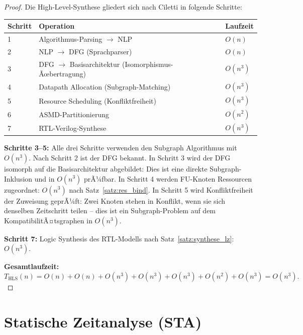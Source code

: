 ﻿\documentclass[a4paper,12pt]{article}
\theoremstyle{definition}
\begin{document}
\begin{proof}
  Die High-Level-Synthese gliedert sich nach Ciletti \cite[S.~550, Abb.~9-2]{ciletti2011}
  in folgende Schritte:

  \begin{center}
  \begin{tabular}{lll}
    \toprule
    Schritt & Operation & Laufzeit \\
    \midrule
    1 & Algorithmus-Parsing $\to$ NLP & $O(n)$ \\
    2 & NLP $\to$ DFG (Sprachparser) & $O(n)$ \\
    3 & DFG $\to$ Basisarchitektur (Isomorphismus-Ãœbertragung) & $O(n^3)$ \\
    4 & Datapath Allocation (Subgraph-Matching) & $O(n^3)$ \\
    5 & Resource Scheduling (Konfliktfreiheit) & $O(n^3)$ \\
    6 & ASMD-Partitionierung & $O(n^2)$ \\
    7 & RTL-Verilog-Synthese & $O(n^3)$ \\
    \bottomrule
  \end{tabular}
  \end{center}

  \textbf{Schritte 3--5:} Alle drei Schritte verwenden den Subgraph Algorithmus mit
  $O(n^3)$. Nach Schritt 2 ist der DFG bekannt. In Schritt 3 wird der DFG isomorph
  auf die Basisarchitektur abgebildet: Dies ist eine direkte Subgraph-Inklusion und
  in $O(n^3)$ prÃ¼fbar. In Schritt 4 werden FU-Knoten Ressourcen zugeordnet: $O(n^3)$
  nach Satz~\ref{satz:res_bind}. In Schritt 5 wird Konfliktfreiheit der Zuweisung
  geprÃ¼ft: Zwei Knoten stehen in Konflikt, wenn sie sich denselben Zeitschritt teilen
  -- dies ist ein Subgraph-Problem auf dem KompatibilitÃ¤tsgraphen in $O(n^3)$.

  \textbf{Schritt 7:} Logic Synthesis des RTL-Modells nach Satz~\ref{satz:synthese_lz}:
  $O(n^3)$.

  \textbf{Gesamtlaufzeit:}
  \[
    T_{\text{HLS}}(n) = O(n) + O(n) + O(n^3) + O(n^3) + O(n^3) + O(n^2) + O(n^3)
    = O(n^3).
  \]
\end{proof}

\section{Statische Zeitanalyse (STA)}
\end{document}
